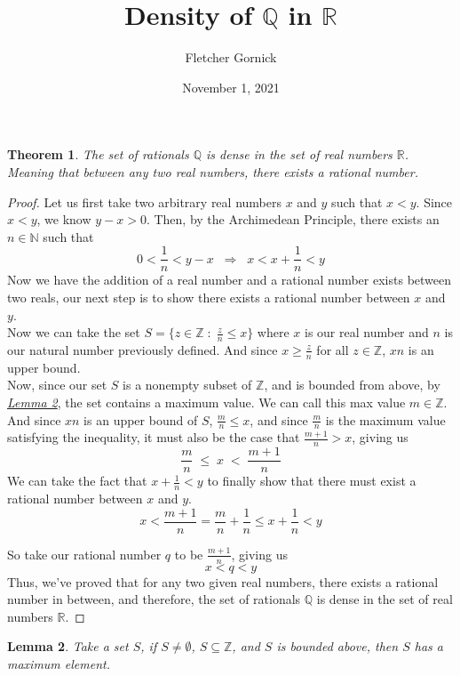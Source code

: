 \documentclass[11pt]{article}
\title{Density of $\mathbb{Q}$ in $\mathbb{R}$}
\author{Fletcher Gornick}
\date{November 1, 2021}
\newtheorem{theorem}{Theorem}
\newtheorem{lemma}[theorem]{Lemma}
\begin{document}
\maketitle
\begin{theorem}
  The set of rationals $\mathbb{Q}$ is dense in the set of real numbers $\mathbb{R}$. 
  Meaning that between any two real numbers, there exists a rational number.
\end{theorem}

\begin{proof}
  Let us first take two arbitrary real numbers $x$ and $y$ such that $x<y$. Since $x<y$, 
  we know $y-x>0$.  Then, by the Archimedean Principle, there exists an $n \in \mathbb{N}$ 
  such that $$0 < \frac{1}{n} < y-x \;\;\Rightarrow\;\; x < x + \frac{1}{n} < y$$ Now we 
  have the addition of a real number and a rational number exists between two reals, our 
  next step is to show there exists a rational number between $x$ and $y$. \\
  
  Now we can take the set $S = \{z \in \mathbb{Z} \;:\; \frac{z}{n} \leq x\}$ where $x$ 
  is our real number and $n$ is our natural number previously defined.  And since 
  $x \geq \frac{z}{n}$ for all $z \in \mathbb{Z}$, $xn$ is an upper bound. \\

  Now, since our set $S$ is a nonempty subset of $\mathbb{Z}$, and is bounded from above, 
  by \textit{\hyperref[L]{Lemma 2}}, the set contains a maximum value.  We can call this 
  max value $m \in \mathbb{Z}$.  And since $xn$ is an upper bound of $S$,
  $\frac{m}{n} \leq x$, and since $\frac{m}{n}$ is the maximum value satisfying the 
  inequality, it must also be the case that $\frac{m+1}{n} > x$, giving us 
  $$\frac{m}{n} \;\leq\; x \;<\; \frac{m+1}{n}$$
  We can take the fact that $x + \frac{1}{n} < y$ to finally show that there must exist a 
  rational number between $x$ and $y$. 
  $$x < \frac{m+1}{n} = \frac{m}{n} + \frac{1}{n} \leq x + \frac{1}{n} < y$$

  So take our rational number $q$ to be $\frac{m+1}{n}$, giving us $$x < q < y$$
  Thus, we've proved that for any two given real numbers, there exists a rational number 
  in between, and therefore, the set of rationals $\mathbb{Q}$ is dense in the set of real 
  numbers $\mathbb{R}$.

\end{proof}
\newpage

\begin{lemma}\label{L}
  Take a set $S$, if $S \neq \emptyset$, $S \subseteq \mathbb{Z}$, and $S$ is bounded above, then 
  $S$ has a maximum element.
\end{lemma}
\end{document}
